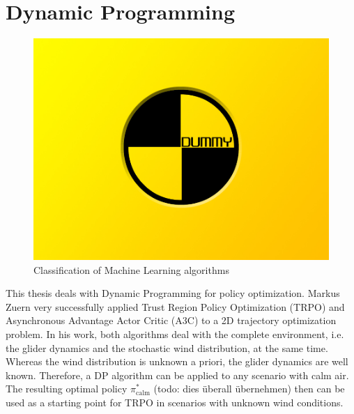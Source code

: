 \chapter{Dynamic Programming}
\label{chapter3}

\begin{figure}[h]
	\includegraphics[width=\textwidth]{src/pics/dummy.jpg}
	\caption{Classification of Machine Learning algorithms}
	\label{fig:model-based-model-free} 
\end{figure}

This thesis deals with Dynamic Programming for policy optimization. Markus Zuern very successfully applied Trust Region Policy Optimization (TRPO) and Asynchronous Advantage Actor Critic (A3C) to a 2D trajectory optimization problem\cite{Zuern2017}. In his work, both algorithms deal with the complete environment, i.e. the glider dynamics and the stochastic wind distribution, at the same time. Whereas the wind distribution is unknown a priori, the glider dynamics are well known. Therefore, a DP algorithm can be applied to any scenario with calm air. The resulting optimal policy $\pi^*_{\text{calm}}$ (todo: dies überall übernehmen) then can be used as a starting point for TRPO in scenarios with unknown wind conditions.

